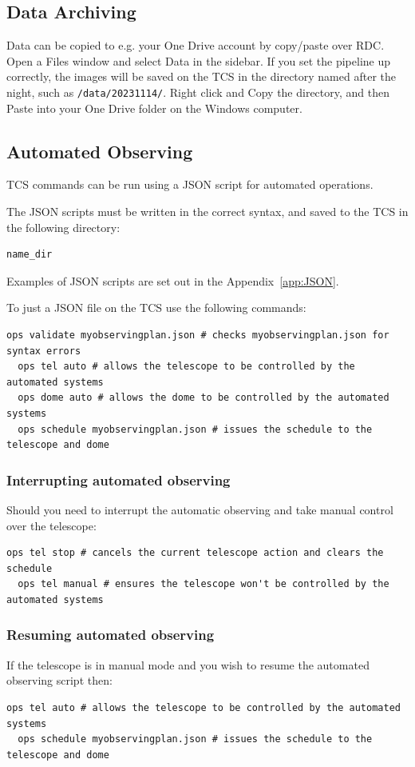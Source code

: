 \documentclass[12pt,a4paper]{article}
\begin{document}
\subsection{Data Archiving}\label{sec:archive}
Data can be copied to e.g. your One Drive account by copy/paste over RDC. Open a Files window and select Data in the sidebar. If you set the pipeline up correctly, the images will be saved on the TCS in the directory named after the night, such as \texttt{/data/20231114/}. Right click and Copy the directory, and then Paste into your One Drive folder on the Windows computer.

\newpage
\subsection{Automated Observing}
\label{sec:auto}
TCS commands can be run using a JSON script for automated operations. 

The JSON scripts must be written in the correct syntax, and saved to the TCS in the following directory:
\begin{lstlisting}[language=sh]
  name_dir
\end{lstlisting}

Examples of JSON scripts are set out in the Appendix~\ref{app:JSON}.

To just a JSON file on the TCS use the following commands:
\begin{lstlisting}[language=commands]
  ops validate myobservingplan.json # checks myobservingplan.json for syntax errors
  ops tel auto # allows the telescope to be controlled by the automated systems
  ops dome auto # allows the dome to be controlled by the automated systems
  ops schedule myobservingplan.json # issues the schedule to the telescope and dome
\end{lstlisting}

\subsubsection{Interrupting automated observing}
Should you need to interrupt the automatic observing and take manual control over the telescope:

\begin{lstlisting}[language=commands]
  ops tel stop # cancels the current telescope action and clears the schedule
  ops tel manual # ensures the telescope won't be controlled by the automated systems
\end{lstlisting}

\subsubsection{Resuming automated observing}
If the telescope is in manual mode and you wish to resume the automated observing script then:
\begin{lstlisting}[language=commands]
  ops tel auto # allows the telescope to be controlled by the automated systems
  ops schedule myobservingplan.json # issues the schedule to the telescope and dome
\end{lstlisting}
\end{document}
